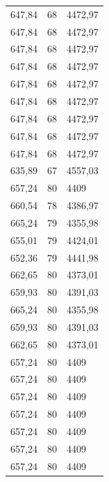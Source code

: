 \begin{center}
\begin{longtable}{|l|l|l|}
647,84            & 68               & 4472,97        \\
647,84            & 68               & 4472,97        \\
647,84            & 68               & 4472,97        \\
647,84            & 68               & 4472,97        \\
647,84            & 68               & 4472,97        \\
647,84            & 68               & 4472,97        \\
647,84            & 68               & 4472,97        \\
647,84            & 68               & 4472,97        \\
647,84            & 68               & 4472,97        \\
635,89            & 67               & 4557,03        \\
657,24            & 80               & 4409           \\
660,54            & 78               & 4386,97        \\
665,24            & 79               & 4355,98        \\
655,01            & 79               & 4424,01        \\
652,36            & 79               & 4441,98        \\
662,65            & 80               & 4373,01        \\
659,93            & 80               & 4391,03        \\
665,24            & 80               & 4355,98        \\
659,93            & 80               & 4391,03        \\
662,65            & 80               & 4373,01        \\
657,24            & 80               & 4409           \\
657,24            & 80               & 4409           \\
657,24            & 80               & 4409           \\
657,24            & 80               & 4409           \\
657,24            & 80               & 4409           \\
657,24            & 80               & 4409           \\
657,24            & 80               & 4409           \\

\end{longtable}
\end{center}

